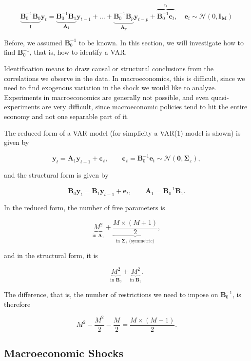 \[
\underbrace{\bm{B}_0^{-1} \bm{B}_0}_{\bm{I}} \bm{y}_t=\underbrace{\bm{B}_0^{-1} \bm{B}_1}_{\bm{A}_1} \bm{y}_{t-1}+\ldots+\underbrace{\bm{B}_0^{-1} \bm{B}_p}_{\bm{A}_p} \bm{y}_{t-p}+\overbrace{\bm{B}_0^{-1} \bm{e}_t}^{\varepsilon_t}, \quad \bm{e}_t \sim \mathcal{N}\left(0, \bm{I}_{\bm{M}}\right)
\]

Before, we assumed $\bm{B}_0^{-1}$ to be known. In this section, we will investigate how to find $\bm{B}_0^{-1}$, that is, how to identify a VAR.

Identification means to draw causal or structural conclusions from the correlations we observe in the data. In macroeconomics, this is difficult, since we need to find exogenous variation in the shock we would like to analyze. Experiments in macroeconomics are generally not possible, and even quasi-experiments are very difficult, since macroeconomic policies tend to hit the entire economy and not one separable part of it.

The reduced form of a VAR model (for simplicity a VAR(1) model is shown) is given by

\begin{equation}
	\bm{y}_t = \bm{A}_1\bm{y}_{t-1}+\bm{\varepsilon}_t,\qquad \bm{\varepsilon}_t = \bm{B}_0^{-1}\bm{e}_t\sim\mathcal{N}(\bm{0},\bm{\Sigma}_\varepsilon),
\end{equation}

and the structural form is given by

\begin{equation}
	\bm{B}_0\bm{y}_t = \bm{B}_1\bm{y}_{t-1}+\bm{e}_t, \qquad \bm{A}_1 = \bm{B}_0^{-1}\bm{B}_1.
\end{equation}

In the reduced form, the number of free parameters is 

\[
	\underbrace{M^2}_{\text{in }\bm{A}_1} + \underbrace{\frac{M\times (M+1)}{2}}_{\text{in $\bm{\Sigma}_\varepsilon$ (symmetric)}},
\]

and in the structural form, it is

\[
	\underbrace{M^2}_{\text{in }\bm{B}_0} + \underbrace{M^2}_{\text{in }\bm{B}_1}. 
\]

The difference, that is, the number of restrictions we need to impose on $\bm{B}_0^{-1}$, is therefore

\[
	M^2 - \frac{M^2}{2} - \frac{M}{2} = \frac{M \times (M - 1)}{2}.
\]

\subsection{Macroeconomic Shocks}

